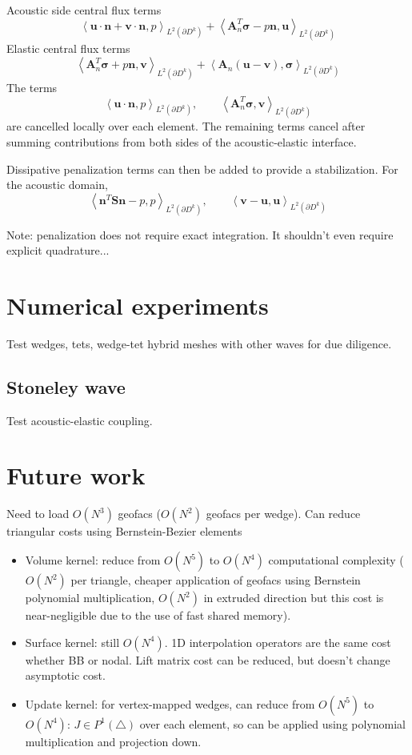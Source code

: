 \documentclass{siamart0216}
\newcommand{\LRp}[1]{\left( #1 \right)}
\newcommand{\LRa}[1]{\left\langle #1 \right\rangle}
\newcommand{\Ldk}{L^2\LRp{\partial D^k}}
\begin{document}
Acoustic side central flux terms
\[
\LRa{\bm{u}\cdot\bm{n} + \bm{v}\cdot\bm{n},p}_{\Ldk} + \LRa{\bm{A}_n^T\bm{\sigma} - p\bm{n},\bm{u}}_{\Ldk}
\]
Elastic central flux terms
\[
\LRa{\bm{A}_n^T\bm{\sigma} + p\bm{n},\bm{v}}_{\Ldk} + \LRa{ \bm{A}_n \LRp{\bm{u} - \bm{v}},\bm{\sigma}}_{\Ldk}
\]
The terms
\[
\LRa{\bm{u}\cdot\bm{n},p}_{\Ldk}, \qquad \LRa{\bm{A}_n^T\bm{\sigma},\bm{v}}_{\Ldk}
\]
are cancelled locally over each element.  The remaining terms cancel after summing contributions from both sides of the acoustic-elastic interface.

Dissipative penalization terms can then be added to provide a stabilization.  For the acoustic domain, 
\[
\LRa{\bm{n}^T\bm{S}\bm{n} - p, p}_{\Ldk}, \qquad \LRa{ \bm{v}-\bm{u},\bm{u}}_{\Ldk}
\]


Note: penalization does not require exact integration.  It shouldn't even require explicit quadrature...

\section{Numerical experiments}

Test wedges, tets, wedge-tet hybrid meshes with other waves for due diligence.

\subsection{Stoneley wave}

Test acoustic-elastic coupling.

\section{Future work}

Need to load $O(N^3)$ geofacs ($O(N^2)$ geofacs per wedge).  Can reduce triangular costs using Bernstein-Bezier elements
\begin{itemize}
\item Volume kernel: reduce from $O(N^5)$ to $O(N^4)$ computational complexity ($O(N^2)$ per triangle, cheaper application of geofacs using Bernstein polynomial multiplication, $O(N^2)$ in extruded direction but this cost is near-negligible due to the use of fast shared memory).  
\item Surface kernel: still $O(N^4)$.  1D interpolation operators are the same cost whether BB or nodal.  Lift matrix cost can be reduced, but doesn't change asymptotic cost.  
\item Update kernel: for vertex-mapped wedges, can reduce from $O(N^5)$ to $O(N^4)$: $J \in P^1(\triangle)$ over each element, so can be applied using polynomial multiplication and projection down.  
\end{itemize}




\end{document}
